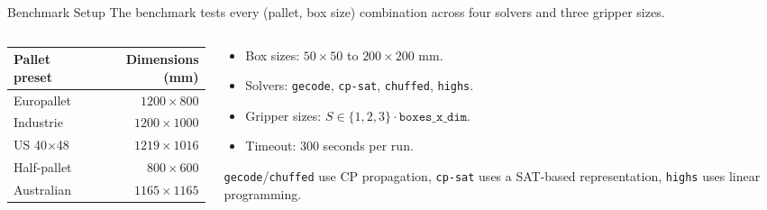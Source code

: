\documentclass[aspectratio=169,xcolor=dvipsnames]{beamer}
\begin{document}
\begin{frame}{Benchmark Setup}
    \small
    The benchmark tests every (pallet, box size) combination across four solvers and three gripper sizes.

    \vspace{0.2cm}
    \begin{columns}[T,totalwidth=\textwidth]
        \begin{column}{0.50\textwidth}
            \begin{table}
                \centering
                \small
                \begin{tabular}{lr}
                    \toprule
                    \textbf{Pallet preset} & \textbf{Dimensions (mm)} \\
                    \midrule
                    Europallet      & $1200 \times 800$  \\
                    Industrie       & $1200 \times 1000$ \\
                    US 40$\times$48 & $1219 \times 1016$ \\
                    Half-pallet     & $800  \times 600$  \\
                    Australian      & $1165 \times 1165$ \\
                    \bottomrule
                \end{tabular}
            \end{table}
        \end{column}
        \begin{column}{0.46\textwidth}
            \begin{itemize}
                \item Box sizes: $50 \times 50$ to $200 \times 200$ mm.
                \item Solvers: \texttt{gecode}, \texttt{cp-sat}, \texttt{chuffed}, \texttt{highs}.
                \item Gripper sizes: $S \in \{1,2,3\} \cdot \texttt{boxes\_x\_dim}$.
                \item Timeout: 300 seconds per run.
            \end{itemize}
            \vspace{0.1cm}
            \small
            \texttt{gecode}/\texttt{chuffed} use CP propagation,
            \texttt{cp-sat} uses a SAT-based representation,
            \texttt{highs} uses linear programming.
        \end{column}
    \end{columns}
\end{frame}
\end{document}

